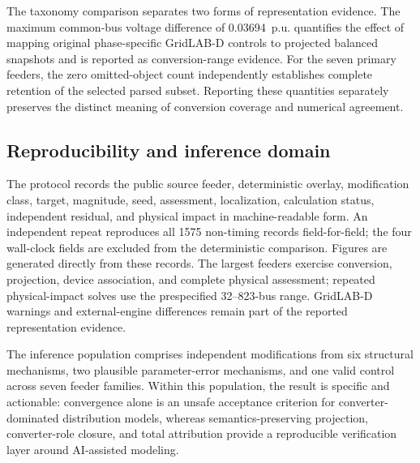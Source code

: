The taxonomy comparison separates two forms of representation evidence. The
maximum common-bus voltage difference of 0.03694~p.u. quantifies the effect of
mapping original phase-specific GridLAB-D controls to projected balanced
snapshots and is reported as conversion-range evidence. For the seven primary
feeders, the zero omitted-object count independently establishes complete
retention of the selected parsed subset. Reporting these quantities separately
preserves the distinct meaning of conversion coverage and numerical agreement.

\subsection{Reproducibility and inference domain}

The protocol records the public source feeder, deterministic overlay,
modification class, target, magnitude, seed, assessment, localization,
calculation status, independent
residual, and physical impact in machine-readable form. An independent repeat
reproduces all 1575 non-timing records field-for-field; the four wall-clock
fields are excluded from the deterministic comparison. Figures are generated
directly from these records. The largest feeders exercise conversion,
projection, device association, and complete physical assessment; repeated
physical-impact solves use the prespecified 32--823-bus range. GridLAB-D warnings
and external-engine differences remain part of the reported representation
evidence.

The inference population comprises independent modifications from six
structural mechanisms, two plausible parameter-error mechanisms, and one valid
control across seven feeder families. Within this population, the result is
specific and actionable: convergence alone is an unsafe acceptance criterion
for converter-dominated distribution models, whereas semantics-preserving
projection, converter-role closure, and total attribution provide a
reproducible verification layer around AI-assisted modeling.
